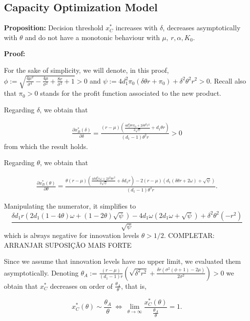 \subsection{Capacity Optimization Model}

\textbf{Proposition:}
Decision threshold $x^*_C$ increases with $\delta$, decreases asymptotically with $\theta$ and do not have a monotonic behaviour with $\mu, \ r, \alpha, K_0$.


\textbf{Proof:}

For the sake of simplicity, we will denote, in this proof, 
$\phi:=\sqrt{\frac{4 \mu ^2}{\sigma ^4}-\frac{4 \mu }{\sigma ^2}+\frac{8 r}{\sigma ^2}+1}>0$ and
$\psi:=4 d_1^2 \pi_0  (\delta  \theta  r+\pi_0 )+\delta ^2 \theta ^2 r^2>0$.
Recall also that $\pi_0>0$ stands for the profit function associated to the new product.

Regarding $\delta$, we obtain that

\begin{align*}
\frac{\partial x^*_B ( \delta ) }{\partial \delta}= \frac{(r-\mu ) \left(\frac{4 d_1^2 \theta  r \pi_0 +2 \delta  \theta ^2 r^2}{2 \sqrt{\psi }}+d_1 \theta  r\right)}{(d_1-1) \theta ^2 r}>0
\end{align*}
from which the result holds.

Regarding $\theta$, we obtain that

\begin{align*}
\frac{\partial x^*_B ( \theta) }{\partial \theta}= \frac{ \theta (r-\mu ) \left(\frac{4 \delta  d_1^2 r \omega +2 \delta ^2 \theta  r^2}{2 \sqrt{\psi }}+\delta  d_1 r\right)- 2 (r-\mu ) \left(d_1 (\delta  \theta  r+2 \omega )+\sqrt{\psi }\right)}{(d_1-1) \theta ^3 r}.
\end{align*}

Manipulating the numerator, it simplifies to
$$
\frac{\delta  d_1 r \left(2 d_1 (1-4 \theta ) \omega +(1-2 \theta ) \sqrt{\psi }\right)-4 d_1 \omega  \left(2 d_1 \omega +\sqrt{\psi }\right)+\delta ^2 \theta ^2 \left(-r^2\right)}{\sqrt{\psi}}$$
which is always negative for innovation levels $\theta>1/2$. COMPLETAR: ARRANJAR SUPOSIÇÃO MAIS FORTE

Since we assume that innovation levels have no upper limit, we evaluated them asymptotically. Denoting $\theta_A:=\frac{(r-\mu )}{(d_1-1) r}  \left(\sqrt{\delta ^2 r^2}+\frac{\delta  r \left(\sigma ^2 (\phi +1)-2 \mu \right)}{2 \sigma ^2}\right)>0$ we obtain that $x^*_C$ decreases on order of $\frac{\theta_A}{\theta}$, that is,  

$$x^*_C(\theta) \sim \frac{\theta_A}{\theta} \ \Leftrightarrow \ \lim_{\theta \to \infty} \frac{x^*_C(\theta)}{\frac{\theta_A}{\theta}}=1.$$

